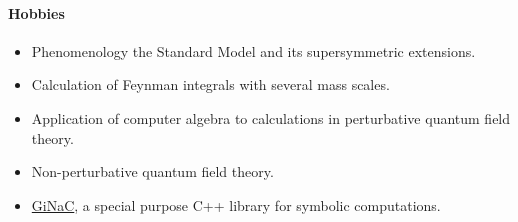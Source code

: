 \documentclass{report}
\begin{document}
\paragraph{Hobbies}
\begin{itemize}
\item Phenomenology the Standard Model and its supersymmetric extensions.
\item Calculation of Feynman integrals with several mass scales.
\item Application of computer algebra to calculations in perturbative quantum field theory.
\item Non-perturbative quantum field theory.
\item \href{http://www.ginac.de}{GiNaC}, a special purpose C++ library for
  symbolic computations.
\end{itemize}
\end{document}
